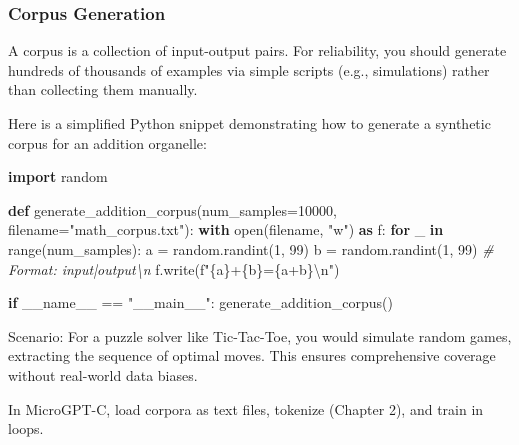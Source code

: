 \documentclass[
]{article}
\newenvironment{Shaded}{}{}
\newcommand{\BuiltInTok}[1]{\textcolor[rgb]{0.00,0.50,0.00}{#1}}
\newcommand{\CharTok}[1]{\textcolor[rgb]{0.25,0.44,0.63}{#1}}
\newcommand{\CommentTok}[1]{\textcolor[rgb]{0.38,0.63,0.69}{\textit{#1}}}
\newcommand{\ControlFlowTok}[1]{\textcolor[rgb]{0.00,0.44,0.13}{\textbf{#1}}}
\newcommand{\DecValTok}[1]{\textcolor[rgb]{0.25,0.63,0.44}{#1}}
\newcommand{\ImportTok}[1]{\textcolor[rgb]{0.00,0.50,0.00}{\textbf{#1}}}
\newcommand{\KeywordTok}[1]{\textcolor[rgb]{0.00,0.44,0.13}{\textbf{#1}}}
\newcommand{\NormalTok}[1]{#1}
\newcommand{\OperatorTok}[1]{\textcolor[rgb]{0.40,0.40,0.40}{#1}}
\newcommand{\SpecialCharTok}[1]{\textcolor[rgb]{0.25,0.44,0.63}{#1}}
\newcommand{\SpecialStringTok}[1]{\textcolor[rgb]{0.73,0.40,0.53}{#1}}
\newcommand{\StringTok}[1]{\textcolor[rgb]{0.25,0.44,0.63}{#1}}
\newcommand{\VariableTok}[1]{\textcolor[rgb]{0.10,0.09,0.49}{#1}}
\begin{document}
\subsubsection{Corpus Generation}\label{corpus-generation}

A corpus is a collection of input-output pairs. For reliability, you
should generate hundreds of thousands of examples via simple scripts
(e.g., simulations) rather than collecting them manually.

Here is a simplified Python snippet demonstrating how to generate a
synthetic corpus for an addition organelle:

\begin{Shaded}
\begin{Highlighting}[]
\ImportTok{import}\NormalTok{ random}

\KeywordTok{def}\NormalTok{ generate\_addition\_corpus(num\_samples}\OperatorTok{=}\DecValTok{10000}\NormalTok{, filename}\OperatorTok{=}\StringTok{"math\_corpus.txt"}\NormalTok{):}
    \ControlFlowTok{with} \BuiltInTok{open}\NormalTok{(filename, }\StringTok{"w"}\NormalTok{) }\ImportTok{as}\NormalTok{ f:}
        \ControlFlowTok{for}\NormalTok{ \_ }\KeywordTok{in} \BuiltInTok{range}\NormalTok{(num\_samples):}
\NormalTok{            a }\OperatorTok{=}\NormalTok{ random.randint(}\DecValTok{1}\NormalTok{, }\DecValTok{99}\NormalTok{)}
\NormalTok{            b }\OperatorTok{=}\NormalTok{ random.randint(}\DecValTok{1}\NormalTok{, }\DecValTok{99}\NormalTok{)}
            \CommentTok{\# Format: \textquotesingle{}input|output\textbackslash{}n\textquotesingle{}}
\NormalTok{            f.write(}\SpecialStringTok{f"}\SpecialCharTok{\{}\NormalTok{a}\SpecialCharTok{\}}\SpecialStringTok{+}\SpecialCharTok{\{}\NormalTok{b}\SpecialCharTok{\}}\SpecialStringTok{=}\SpecialCharTok{\{}\NormalTok{a}\OperatorTok{+}\NormalTok{b}\SpecialCharTok{\}}\CharTok{\textbackslash{}n}\SpecialStringTok{"}\NormalTok{)}

\ControlFlowTok{if} \VariableTok{\_\_name\_\_} \OperatorTok{==} \StringTok{"\_\_main\_\_"}\NormalTok{:}
\NormalTok{    generate\_addition\_corpus()}
\end{Highlighting}
\end{Shaded}

Scenario: For a puzzle solver like Tic-Tac-Toe, you would simulate
random games, extracting the sequence of optimal moves. This ensures
comprehensive coverage without real-world data biases.

In MicroGPT-C, load corpora as text files, tokenize (Chapter 2), and
train in loops.
\end{document}
